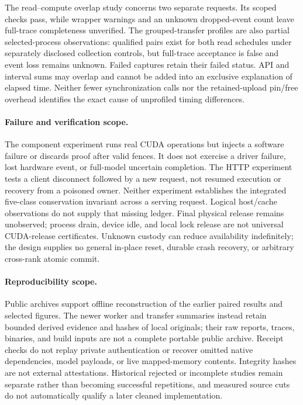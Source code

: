 The read--compute overlap study concerns two separate requests. Its scoped
checks pass, while wrapper warnings and an unknown dropped-event count leave
full-trace completeness unverified. The grouped-transfer profiles are also
partial selected-process observations: qualified pairs exist for both read
schedules under separately disclosed collection controls, but full-trace
acceptance is false and event loss remains unknown. Failed captures retain
their failed status. API and interval sums may overlap and cannot be added
into an exclusive explanation of elapsed time. Neither fewer synchronization
calls nor the retained-upload pin/free overhead identifies the exact cause of
unprofiled timing differences.

\paragraph{Failure and verification scope.}
The component experiment runs real CUDA operations but injects a software
failure or discards proof after valid fences. It does not exercise a driver
failure, lost hardware event, or full-model uncertain completion. The HTTP
experiment tests a client disconnect followed by a new request, not resumed
execution or recovery from a poisoned owner. Neither experiment establishes
the integrated five-class conservation invariant across a serving request.
Logical host/cache observations do not supply that missing ledger. Final
physical release remains unobserved; process drain, device idle, and local
lock release are not universal CUDA-release certificates. Unknown custody
can reduce availability indefinitely; the design supplies no general in-place
reset, durable crash recovery, or arbitrary cross-rank atomic commit.

\paragraph{Reproducibility scope.}
Public archives support offline reconstruction of the earlier paired results
and selected figures. The newer worker and transfer summaries instead retain
bounded derived evidence and hashes of local originals; their raw reports,
traces, binaries, and build inputs are not a complete portable public archive.
Receipt checks do not replay private authentication or recover omitted native
dependencies, model payloads, or live mapped-memory contents. Integrity hashes
are not external attestations. Historical rejected or incomplete studies
remain separate rather than becoming successful repetitions, and measured
source cuts do not automatically qualify a later cleaned implementation.

